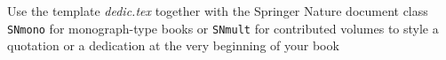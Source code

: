 %
%
%

\begin{dedication}
Use the template \emph{dedic.tex} together with the Springer Nature document class \verb|SNmono| for monograph-type books or \verb|SNmult| for contributed volumes to style a quotation or a dedication at the very beginning of your book
\end{dedication}
